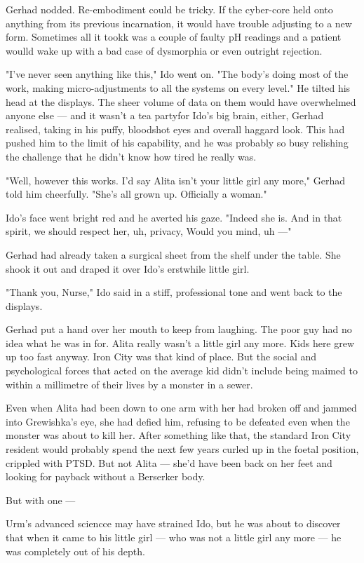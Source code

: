 \documentclass[11pt]{article}
\begin{document}
Gerhad nodded. Re-embodiment could be tricky. If the cyber-core held onto anything from its previous incarnation, it would have trouble adjusting to a new form. Sometimes all it tookk was a couple of faulty pH readings and a patient woulld wake up with a bad case of dysmorphia or even outright rejection.

"I've never seen anything like this," Ido went on. "The body's doing most of the work, making micro-adjustments to all the systems on every level." He tilted his head at the displays. The sheer volume of data on them would have overwhelmed anyone else --- and it wasn't a tea partyfor Ido's big brain, either, Gerhad realised, taking in his puffy, bloodshot eyes and overall haggard look. This had pushed him to the limit of his capability, and he was probably so busy relishing the challenge that he didn't know how tired he really was.

"Well, however this works. I'd say Alita isn't your little girl any more," Gerhad told him cheerfully. "She's all grown up. Officially a woman."

Ido's face went bright red and he averted his gaze. "Indeed she is. And in that spirit, we should respect her, uh, privacy, Would you mind, uh ---"

Gerhad had already taken a surgical sheet from the shelf under the table. She shook it out and draped it over Ido's erstwhile little girl.

"Thank you, Nurse," Ido said in a stiff, professional tone and went back to the displays.

Gerhad put a hand over her mouth to keep from laughing. The poor guy had no idea what he was in for. Alita really wasn't a little girl any more. Kids here grew up too fast anyway. Iron City was that kind of place. But the social and psychological forces that acted on the average kid didn't include being maimed to within a millimetre of their lives by a monster in a sewer.

Even when Alita had been down to one arm with her had broken off and jammed into Grewishka's eye, she had defied him, refusing to be defeated even when the monster was about to kill her. After something like that, the standard Iron City resident would probably spend the next few years curled up in the foetal position, crippled with PTSD. But not Alita --- she'd have been back on her feet and looking for payback without a Berserker body.

But with one ---

Urm's advanced sciencce may have strained Ido, but he was about to discover that when it came to his little girl --- who was not a little girl any more --- he was completely out of his depth.
\end{document}
